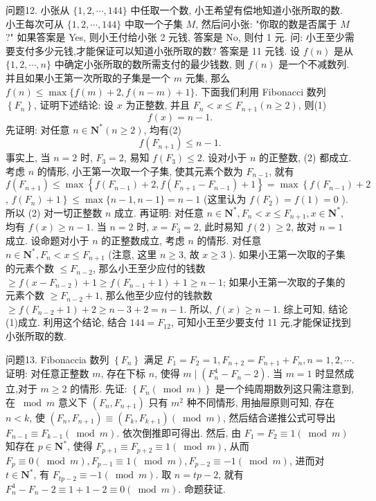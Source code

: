 问题12. 小张从 $\{1,2, \cdots, 144\}$ 中任取一个数, 小王希望有偿地知道小张所取的数.
小王每次可从 $\{1,2, \cdots, 144\}$ 中取一个子集 $M$, 然后问小张: "你取的数是否属于 $M$ ?" 如果答案是 Yes, 则小王付给小张 2 元钱, 答案是 $\mathrm{No}$, 则付 1 元.
问: 小王至少需要支付多少元钱,才能保证可以知道小张所取的数?
答案是 11 元钱.
设 $f(n)$ 是从 $\{1,2, \cdots, n\}$ 中确定小张所取的数所需支付的最少钱数, 则 $f(n)$ 是一个不减数列.
并且如果小王第一次所取的子集是一个 $m$ 元集, 那么 $f(n) \leqslant \max \{f(m)+2, f(n-m)+1\}$.
下面我们利用 Fibonacci 数列 $\left\{F_n\right\}$, 证明下述结论: 设 $x$ 为正整数, 并且 $F_n<x \leqslant F_{n+1}(n \geqslant 2)$, 则(1)
$$
f(x)=n-1 .
$$
先证明: 对任意 $n \in \mathbf{N}^*(n \geqslant 2)$, 均有(2)
$$
f\left(F_{n+1}\right) \leqslant n-1 .
$$
事实上, 当 $n=2$ 时, $F_3=2$, 易知 $f\left(F_3\right) \leqslant 2$. 设对小于 $n$ 的正整数, (2) 都成立.
考虑 $n$ 的情形, 小王第一次取一个子集, 使其元素个数为 $F_{n-1}$, 就有 $f\left(F_{n+1}\right) \leqslant \max \left\{f\left(F_{n-1}\right)+2, f\left(F_{n+1}-F_{n-1}\right)+1\right\}=\max \left\{f\left(F_{n-1}\right)+2\right.$, $\left.f\left(F_n\right)+1\right\} \leqslant \max \{n-1, n-1\}=n-1$ (这里认为 $f\left(F_2\right)=f(1)=0$ ). 所以 (2) 对一切正整数 $n$ 成立.
再证明: 对任意 $n \in \mathbf{N}^*, F_n<x \leqslant F_{n+1}, x \in \mathbf{N}^*$, 均有 $f(x) \geqslant n-1$.
当 $n=2$ 时, $x=F_3=2$, 此时易知 $f(2) \geqslant 2$, 故对 $n=1$ 成立.
设命题对小于 $n$ 的正整数成立, 考虑 $n$ 的情形.
对任意 $n \in \mathbf{N}^*, F_n<x \leqslant F_{n+1}$ (注意, 这里 $n \geqslant 3$, 故 $x \geqslant 3$ ).
如果小王第一次取的子集的元素个数 $\leqslant F_{n-2}$, 那么小王至少应付的钱数 $\geqslant f\left(x-F_{n-2}\right)+1 \geqslant f\left(F_{n-1}+1\right)+1 \geqslant n-1$; 如果小王第一次取的子集的元素个数 $\geqslant F_{n-2}+1$, 那么他至少应付的钱款数 $\geqslant f\left(F_{n-2}+1\right)+2 \geqslant n-3+ 2=n-1$. 所以, $f(x) \geqslant n-1$.
综上可知, 结论(1)成立.
利用这个结论, 结合 $144=F_{12}$, 可知小王至少要支付 11 元,才能保证找到小张所取的数.



问题13. Fibonaccia 数列 $\left\{F_n\right\}$ 满足 $F_1=F_2=1, F_{n+2}=F_{n+1}+F_n, n=1,2, \cdots$. 证明: 对任意正整数 $m$, 存在下标 $n$, 使得 $m \mid\left(F_n^4-F_n-2\right)$.
当 $m=1$ 时显然成立,对于 $m \geqslant 2$ 的情形.
先证: $\left\{F_n(\bmod m)\right\}$ 是一个纯周期数列这只需注意到, 在 $\bmod m$ 意义下 $\left(F_n, F_{n+1}\right)$ 只有 $m^2$ 种不同情形, 用抽屉原则可知, 存在 $n<k$, 使 $\left(F_n, F_{n+1}\right) \equiv\left(F_k, F_{k+1}\right)(\bmod m)$, 然后结合递推公式可导出 $F_{n-1} \equiv F_{k-1}(\bmod m)$. 依次倒推即可得出.
然后, 由 $F_1=F_2 \equiv 1(\bmod m)$ 知存在 $p \in \mathbf{N}^*$, 使得 $F_{p+1} \equiv F_{p+2} \equiv 1(\bmod m)$, 从而 $F_p \equiv 0(\bmod m), F_{p-1} \equiv 1(\bmod m), F_{p-2} \equiv-1(\bmod m)$, 进而对 $t \in \mathbf{N}^*$, 有 $F_{t p-2} \equiv-1(\bmod m)$. 取 $n=t p-2$, 就有 $F_n^4-F_n-2 \equiv 1+ 1-2 \equiv 0(\bmod m)$. 命题获证.



